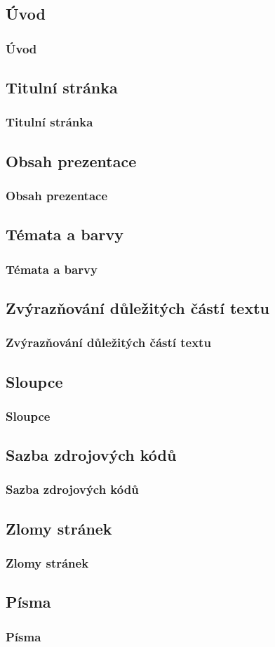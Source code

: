\subsection{Úvod}
\begin{frame}
	\frametitle{Úvod}
	\UnderConstruction
\end{frame}


\subsection{Titulní stránka}
\begin{frame}
	\frametitle{Titulní stránka}
	\UnderConstruction
\end{frame}


\subsection{Obsah prezentace}
\begin{frame}
	\frametitle{Obsah prezentace}
	\UnderConstruction
\end{frame}


\subsection{Témata a barvy}
\begin{frame}
	\frametitle{Témata a barvy}
	\UnderConstruction
\end{frame}


\subsection{Zvýrazňování důležitých částí textu}
\begin{frame}
	\frametitle{Zvýrazňování důležitých částí textu}
	\UnderConstruction
\end{frame}


\subsection{Sloupce}
\begin{frame}
	\frametitle{Sloupce}
	\UnderConstruction
\end{frame}


\subsection{Sazba zdrojových kódů}
\begin{frame}
	\frametitle{Sazba zdrojových kódů}
	\UnderConstruction
\end{frame}


\subsection{Zlomy stránek}
\begin{frame}
	\frametitle{Zlomy stránek}
	\UnderConstruction
\end{frame}


\subsection{Písma}
\begin{frame}
	\frametitle{Písma}
	\UnderConstruction
\end{frame}

\endinput
